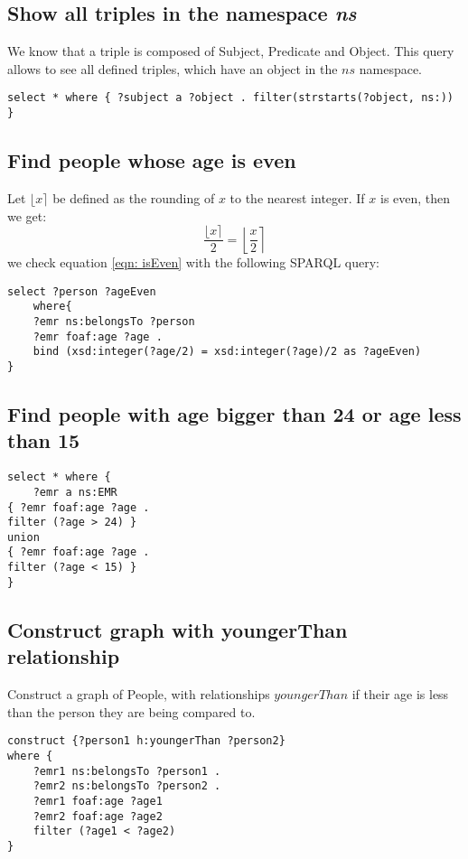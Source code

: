 \documentclass[12pt]{article}
\begin{document}
\subsection{Show all triples in the namespace \textit{ns}}
We know that a triple is composed of Subject, Predicate and Object. This query allows to see all defined triples, which have an object in the \(ns\) namespace.
\begin{verbatim}
select * where { ?subject a ?object . filter(strstarts(?object, ns:)) }
\end{verbatim}

\subsection{Find people whose age is even}
Let \(\lfloor x \rceil\) be defined as the rounding of \(x\) to the nearest integer. If \(x\) is even, then we get:
\begin{equation}
    \label{eqn: isEven}
    \frac{\lfloor x \rceil}{2} = \left \lfloor \frac{x}{2} \right \rceil
\end{equation}
we check equation \eqref{eqn: isEven} with the following SPARQL query:
\begin{verbatim}
select ?person ?ageEven
    where{
    ?emr ns:belongsTo ?person
    ?emr foaf:age ?age .
    bind (xsd:integer(?age/2) = xsd:integer(?age)/2 as ?ageEven)
}
\end{verbatim}

\subsection{Find people with age bigger than 24 or age less than 15}
\begin{verbatim}
select * where {
    ?emr a ns:EMR
{ ?emr foaf:age ?age .
filter (?age > 24) }
union
{ ?emr foaf:age ?age .
filter (?age < 15) }
}
\end{verbatim}


\subsection{Construct graph with youngerThan relationship}
Construct a graph of People, with relationships \(youngerThan\) if their age is less than the person they are being compared to.
\begin{verbatim}
construct {?person1 h:youngerThan ?person2}
where {
    ?emr1 ns:belongsTo ?person1 .
    ?emr2 ns:belongsTo ?person2 .
    ?emr1 foaf:age ?age1 
    ?emr2 foaf:age ?age2 
    filter (?age1 < ?age2)
}
\end{verbatim}
\end{document}
